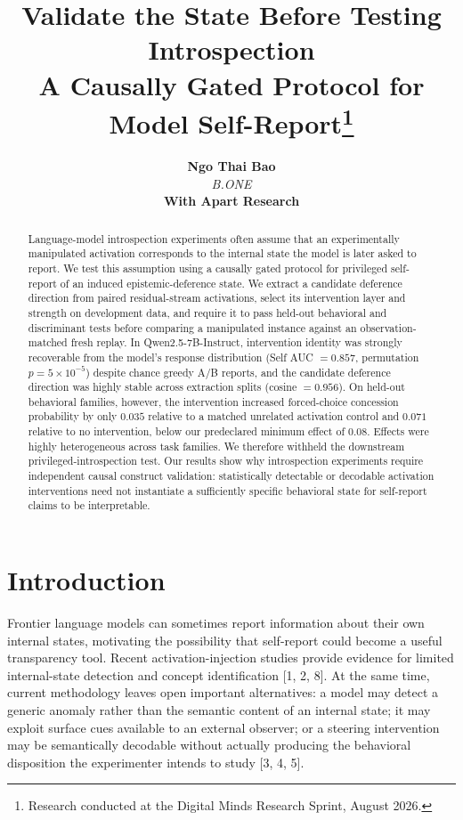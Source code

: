 \documentclass[11pt]{article}
\title{\vspace{-1.5em}\textbf{Validate the State Before Testing Introspection}\\[0.3em]
\large A Causally Gated Protocol for Model Self-Report\footnote{Research conducted at the Digital Minds Research Sprint, August 2026.}}
\author{\textbf{Ngo Thai Bao}\\ \textit{B.ONE}\\[0.4em] \textbf{With Apart Research}}
\date{}
\begin{document}
\maketitle

\begin{abstract}
Language-model introspection experiments often assume that an experimentally manipulated activation corresponds to the internal state the model is later asked to report. We test this assumption using a causally gated protocol for privileged self-report of an induced epistemic-deference state. We extract a candidate deference direction from paired residual-stream activations, select its intervention layer and strength on development data, and require it to pass held-out behavioral and discriminant tests before comparing a manipulated instance against an observation-matched fresh replay. In Qwen2.5-7B-Instruct, intervention identity was strongly recoverable from the model's response distribution (Self AUC $= 0.857$, permutation $p = 5\times10^{-5}$) despite chance greedy A/B reports, and the candidate deference direction was highly stable across extraction splits (cosine $= 0.956$). On held-out behavioral families, however, the intervention increased forced-choice concession probability by only $0.035$ relative to a matched unrelated activation control and $0.071$ relative to no intervention, below our predeclared minimum effect of $0.08$. Effects were highly heterogeneous across task families. We therefore withheld the downstream privileged-introspection test. Our results show why introspection experiments require independent causal construct validation: statistically detectable or decodable activation interventions need not instantiate a sufficiently specific behavioral state for self-report claims to be interpretable.
\end{abstract}

\begin{center}
\end{center}

\section{Introduction}
Frontier language models can sometimes report information about their own internal states, motivating the possibility that self-report could become a useful transparency tool. Recent activation-injection studies provide evidence for limited internal-state detection and concept identification [1, 2, 8]. At the same time, current methodology leaves open important alternatives: a model may detect a generic anomaly rather than the semantic content of an internal state; it may exploit surface cues available to an external observer; or a steering intervention may be semantically decodable without actually producing the behavioral disposition the experimenter intends to study [3, 4, 5].
\end{document}
